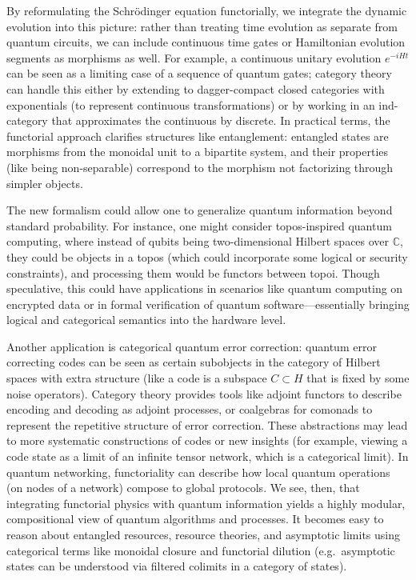 \documentclass[12pt]{article}
\begin{document}
By reformulating the Schrödinger equation functorially, we integrate the dynamic evolution into this picture: rather than treating time evolution as separate from quantum circuits, we can include continuous time gates or Hamiltonian evolution segments as morphisms as well. For example, a continuous unitary evolution $e^{-iHt}$ can be seen as a limiting case of a sequence of quantum gates; category theory can handle this either by extending to dagger-compact closed categories with exponentials (to represent continuous transformations) or by working in an ind-category that approximates the continuous by discrete. In practical terms, the functorial approach clarifies structures like entanglement: entangled states are morphisms from the monoidal unit to a bipartite system, and their properties (like being non-separable) correspond to the morphism not factorizing through simpler objects.

The new formalism could allow one to generalize quantum information beyond standard probability. For instance, one might consider topos-inspired quantum computing, where instead of qubits being two-dimensional Hilbert spaces over $\mathbb{C}$, they could be objects in a topos (which could incorporate some logical or security constraints), and processing them would be functors between topoi. Though speculative, this could have applications in scenarios like quantum computing on encrypted data or in formal verification of quantum software---essentially bringing logical and categorical semantics into the hardware level.

Another application is categorical quantum error correction: quantum error correcting codes can be seen as certain subobjects in the category of Hilbert spaces with extra structure (like a code is a subspace $C \subset H$ that is fixed by some noise operators). Category theory provides tools like adjoint functors to describe encoding and decoding as adjoint processes, or coalgebras for comonads to represent the repetitive structure of error correction. These abstractions may lead to more systematic constructions of codes or new insights (for example, viewing a code state as a limit of an infinite tensor network, which is a categorical limit). In quantum networking, functoriality can describe how local quantum operations (on nodes of a network) compose to global protocols. We see, then, that integrating functorial physics with quantum information yields a highly modular, compositional view of quantum algorithms and processes. It becomes easy to reason about entangled resources, resource theories, and asymptotic limits using categorical terms like monoidal closure and functorial dilution (e.g.\ asymptotic states can be understood via filtered colimits in a category of states). 
\end{document}
